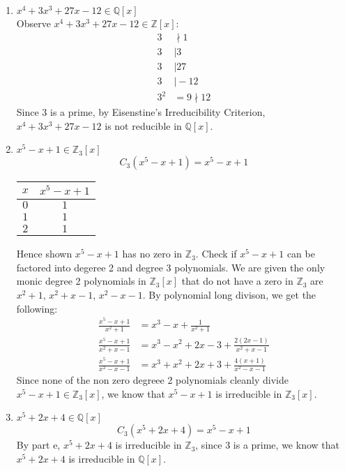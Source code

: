 \documentclass[12pt]{article}
\begin{document}
\begin{enumerate}
\begin{enumerate}
		\item $x^4 + 3x^3 + 27x - 12 \in \mathbb{Q}[x]$\\
			Observe $x^4 + 3x^3 + 27x - 12 \in \mathbb{Z}[x]$:
			\begin{align*}
				3 &\nmid 1\\
				3 &\mid 3\\
				3 &\mid 27\\
				3 &\mid -12\\
				3^2 &= 9 \nmid 12
			\end{align*}
			Since $3$ is a prime, by Eisenstine's Irreducibility Criterion, $x^4 +
			3x^3 + 27x - 12$ is not reducible in $\mathbb{Q}[x]$.

		\item $x^5 - x + 1 \in \mathbb{Z}_3[x]$\\
			$$C_3(x^5 - x + 1) = x^5 - x + 1$$

			\begin{center}
				\begin{tabular} {c | c}
					$x$ & $x^5 - x + 1$\\
					\hline
					$0$ & $1$\\
					$1$ & $1$\\
					$2$ & $1$
				\end{tabular}
			\end{center}
			Hence shown $x^5 - x + 1$ has no zero in $\mathbb{Z}_3$. Check if $x^5 - x +
			1$ can be factored into degeree 2 and degree 3 polynomials. We are given
			the only monic degree 2 polynomials in $\mathbb{Z}_3[x]$ that do not have
			a zero in $\mathbb{Z}_3$ are $x^2+1$, $x^2 + x - 1$, $x^2 - x - 1$. By
			polynomial long divison, we get the following:
			\begin{align*}
				\frac{x^5 - x + 1}{x^2+1} &= x^3 - x + \frac{1}{x^2+1}\\
				\frac{x^5 - x + 1}{x^2 + x - 1} &= x^3 - x^2 + 2x - 3 +
				\frac{2(2x-1)}{x^2 + x -1}\\
				\frac{x^5 - x + 1}{x^2 - x - 1} &= x^3 + x^2 + 2x + 3 +
				\frac{4(x+1)}{x^2-x-1}
			\end{align*}
			Since none of the non zero degreee 2 polynomials cleanly divide $x^5 - x +
			1 \in \mathbb{Z}_3[x]$,  we know that $x^5 - x + 1$ is irreducible in
			$\mathbb{Z}_3[x]$.

		\item $x^5 + 2x + 4 \in \mathbb{Q}[x]$
			$$C_3(x^5 + 2x + 4) = x^5 - x + 1$$
			By part e, $x^5 + 2x + 4$ is irreducible in $\mathbb{Z}_3$, since 3 is a
			prime, we know that $x^5 + 2x + 4$ is irreducible in $\mathbb{Q}[x]$.


\end{enumerate}
\end{enumerate}
\end{document}
